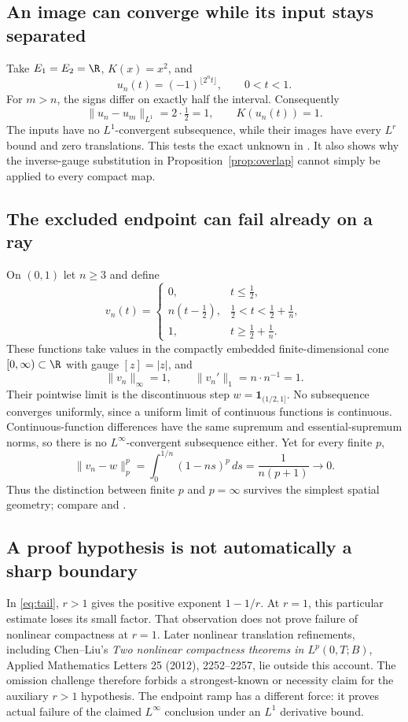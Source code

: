 \documentclass[12pt,reqno]{amsart}
\begin{document}
\subsection{An image can converge while its input stays separated}
Take $E_1=E_2=\R$, $K(x)=x^2$, and
\[
u_n(t)=(-1)^{\lfloor 2^nt\rfloor},\qquad 0<t<1.
\]
For $m>n$, the signs differ on exactly half the interval. Consequently
\[
\|u_n-u_m\|_{L^1}=2\cdot\tfrac12=1,
\qquad K(u_n(t))=1.
\]
The inputs have no $L^1$-convergent subsequence, while their images have every $L^r$ bound and zero translations. This tests the exact unknown in \cite[Theorem 2.1 and Remark 2.2(3), p.~1726]{S-maitre}. It also shows why the inverse-gauge substitution in Proposition~\ref{prop:overlap} cannot simply be applied to every compact map.
\subsection{The excluded endpoint can fail already on a ray}
On $(0,1)$ let $n\ge3$ and define
\[
v_n(t)=\begin{cases}
0,&t\le\tfrac12,\\
n(t-\tfrac12),&\tfrac12<t<\tfrac12+\tfrac1n,\\
1,&t\ge\tfrac12+\tfrac1n.
\end{cases}
\]
These functions take values in the compactly embedded finite-dimensional cone $[0,\infty)\subset\R$ with gauge $[z]=|z|$, and
\[
\|v_n\|_\infty=1,\qquad \|v_n'\|_1=n\cdot n^{-1}=1.
\]
Their pointwise limit is the discontinuous step $w=\mathbf1_{(1/2,1]}$. No subsequence converges uniformly, since a uniform limit of continuous functions is continuous. Continuous-function differences have the same supremum and essential-supremum norms, so there is no $L^\infty$-convergent subsequence either. Yet for every finite $p$,
\begin{equation}\label{eq:ramp}
\|v_n-w\|_p^p=\int_0^{1/n}(1-ns)^p\,ds=\frac1{n(p+1)}\longrightarrow0.
\end{equation}
Thus the distinction between finite $p$ and $p=\infty$ survives the simplest spatial geometry; compare \cite[Corollary 4, pp.~85--86; Proposition 3, p.~94]{S-simon} and \cite[Remark 2, p.~4]{S-barrett-suli}.
\subsection{A proof hypothesis is not automatically a sharp boundary}
In \eqref{eq:tail}, $r>1$ gives the positive exponent $1-1/r$. At $r=1$, this particular estimate loses its small factor. That observation does not prove failure of nonlinear compactness at $r=1$.
Later nonlinear translation refinements, including Chen--Liu's \emph{Two nonlinear compactness theorems in $L^p(0,T;B)$}, Applied Mathematics Letters 25 (2012), 2252--2257, lie outside this account. The omission challenge therefore forbids a strongest-known or necessity claim for the auxiliary $r>1$ hypothesis. The endpoint ramp has a different force: it proves actual failure of the claimed $L^\infty$ conclusion under an $L^1$ derivative bound.
\end{document}
